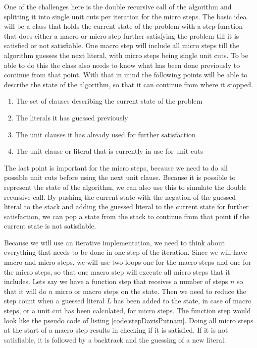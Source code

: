 One of the challenges here is the double recursive call of the algorithm and splitting it into single unit cuts per iteration for the micro steps. The basic idea will be a class that holds the current state of the problem with a step function that does either a macro or micro step further satisfying the problem till it is satisfied or not satisfiable. One macro step will include all micro steps till the algorithm guesses the next literal, with micro steps being single unit cuts. To be able to do this the class also needs to know what has been done previously to continue from that point. With that in mind the following points will be able to describe the state of the algorithm, so that it can continue from where it stopped.

\begin{enumerate}
    \item The set of clauses describing the current state of the problem
    \item The literals it has guessed previously
    \item The unit clauses it has already used for further satisfaction
    \item The unit clause or literal that is currently in use for unit cuts
\end{enumerate}

The last point is important for the micro steps, because we need to do all possible unit cuts before using the next unit clause. Because it is possible to represent the state of the algorithm, we can also use this to simulate the double recursive call. By pushing the current state with the negation of the guessed literal to the stack and adding the guessed literal to the current state for further satisfaction, we can pop a state from the stack to continue from that point if the current state is not satisfiable.

Because we will use an iterative implementation, we need to think about everything that needs to be done in one step of the iteration. Since we will have macro and micro steps, we will use two loops one for the macro steps and one for the micro steps, so that one macro step will execute all micro steps that it includes. Lets say we have a function step that receives a number of steps $n$ so that it will do $n$ micro or macro steps on the state. Then we need to reduce the step count when a guessed literal $L$ has been added to the state, in case of macro steps, or a unit cut has been calculated, for micro steps. The function step would look like the pseudo code of listing \ref{code:stepDavisPutnam}. Doing all micro steps at the start of a macro step results in checking if it is satisfied. If it is not satisfiable, it is followed by a backtrack and the guessing of a new literal.

